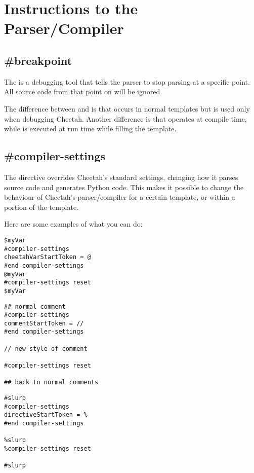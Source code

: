 \section{Instructions to the Parser/Compiler}
\label{parserInstructions}


\subsection{\#breakpoint}
\label{parserInstructions.breakpoint}

The  is a debugging tool that tells the parser to stop
parsing at a specific point. All source code from that point on will be ignored.

The difference between  and  is that
 occurs in normal templates but  is used
only when debugging Cheetah.  Another difference is that 
operates at compile time, while  is executed at run time while
filling the template.


\subsection{\#compiler-settings}
\label{parserInstructions.settings}

The  directive overrides Cheetah's standard settings,
changing how it parses source code and generates Python code.  This
makes it possible to change the behaviour of Cheetah's parser/compiler for a
certain template, or within a portion of the template.

Here are some examples of what you can do:
\begin{verbatim}
$myVar
#compiler-settings
cheetahVarStartToken = @
#end compiler-settings
@myVar
#compiler-settings reset
$myVar
\end{verbatim}


\begin{verbatim}
## normal comment
#compiler-settings
commentStartToken = //
#end compiler-settings

// new style of comment

#compiler-settings reset

## back to normal comments
\end{verbatim}

\begin{verbatim}
#slurp
#compiler-settings
directiveStartToken = %
#end compiler-settings

%slurp
%compiler-settings reset

#slurp
\end{verbatim}


